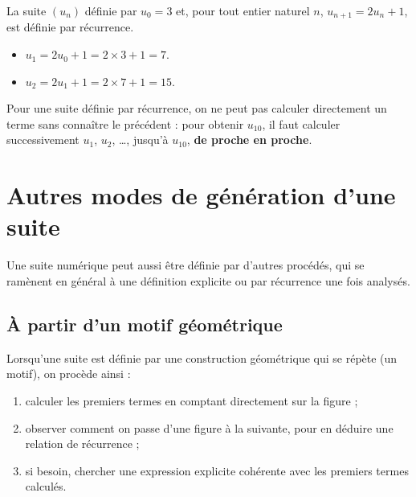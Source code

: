 \documentclass[10pt,a4paper]{article}
\begin{document}
\begin{exple}
    La suite \((u_n)\) définie par \(u_0=3\) et, pour tout entier naturel \(n\), \(u_{n+1}=2u_n+1\), est définie par récurrence.
    \begin{itemize}
        \item \(u_1 = 2u_0+1 = 2\times 3+1 = 7\).
        \item \(u_2 = 2u_1+1 = 2\times 7+1 = 15\).
    \end{itemize}
\end{exple}

\begin{met}
    Pour une suite définie par récurrence, on ne peut pas calculer directement un terme sans connaître le précédent : pour obtenir \(u_{10}\), il faut calculer successivement \(u_1\), \(u_2\), \ldots, jusqu'à \(u_{10}\), \textbf{de proche en proche}.
\end{met}


\section{Autres modes de génération d'une suite}

\begin{rem}
    Une suite numérique peut aussi être définie par d'autres procédés, qui se ramènent en général à une définition explicite ou par récurrence une fois analysés.
\end{rem}

\subsection{À partir d'un motif géométrique}

\begin{met}
    Lorsqu'une suite est définie par une construction géométrique qui se répète (un motif), on procède ainsi :
    \begin{enumerate}
        \item calculer les premiers termes en comptant directement sur la figure ;
        \item observer comment on passe d'une figure à la suivante, pour en déduire une relation de récurrence ;
        \item si besoin, chercher une expression explicite cohérente avec les premiers termes calculés.
    \end{enumerate}
\end{met}
\end{document}
